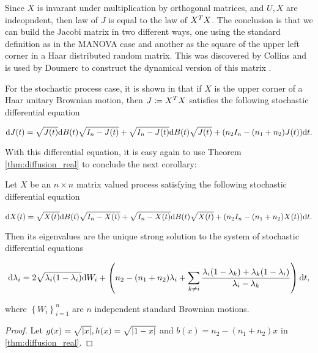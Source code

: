 Since $X$ is invarant under multiplication by orthogonal matrices, and $U,X$ are indeopndent, then law of $J$ is equal to the law of $X^T X$. The conclusion is that we can build the Jacobi matrix in two different ways, one using the standard definition as in the MANOVA case and another as the square of the upper left corner in a Haar distributed random matrix. This was discovered by Collins \cite{thesis:collins} and is used by Doumerc to construct the dynamical version of this matrix \cite{doumerc2005matrices}.

For the stochastic process case, it is shown in \cite{doumerc2005matrices} that if $X$ is the upper corner of a Haar unitary Brownian motion, then $J \coloneqq X^T X$ satisfies the following stochastic differential equation

\begin{equation*}
    \mathrm d J (t) = \sqrt{J(t)} \mathrm d B(t) \sqrt{I_n - J(t)} + \sqrt{I_n - J(t)} \mathrm d B(t) \sqrt{J(t)} + (n_2 I_n - (n_1 + n_2) J(t) ) \mathrm d t.
\end{equation*}

With this differential equation, it is easy again to use Theorem \ref{thm:diffusion_real} to conclude the next corollary: 

\begin{corollary}
    Let $X$ be an $n\times n$ matrix valued process satisfying the following stochastic differential equation

    \begin{equation*}
        \mathrm d X (t) = \sqrt{X(t)} \mathrm d B(t) \sqrt{I_n - X(t)} + \sqrt{I_n - X(t)} \mathrm d B(t) \sqrt{X(t)} + (n_2 I_n - (n_1 + n_2) X(t) ) \mathrm d t.
    \end{equation*}

    Then its eigenvalues are the unique strong solution to the system of stochastic differential equations

    \begin{equation} \label{eq:jacobi}
        \mathrm d \lambda_i = 2 \sqrt{\lambda_i(1-\lambda_i)} \mathrm d W_i + \left( n_2 -(n_1 + n_2)\lambda_i + \sum_{k\neq i} \frac{\lambda_i(1-\lambda_k) + \lambda_k(1-\lambda_i)}{\lambda_i - \lambda_k} \right) \mathrm d t,
    \end{equation}

    \noindent where $\left\{ W_{i} \right\}_{i=1}^n$ are $n$ independent standard Brownian motions.
\end{corollary}

\begin{proof}
    Let $g(x) = \sqrt{\lvert x \rvert}, h(x) = \sqrt{\lvert 1-x \rvert}$ and $b(x) = n_2 - (n_1 + n_2)x$ in \ref{thm:diffusion_real}. 
\end{proof}